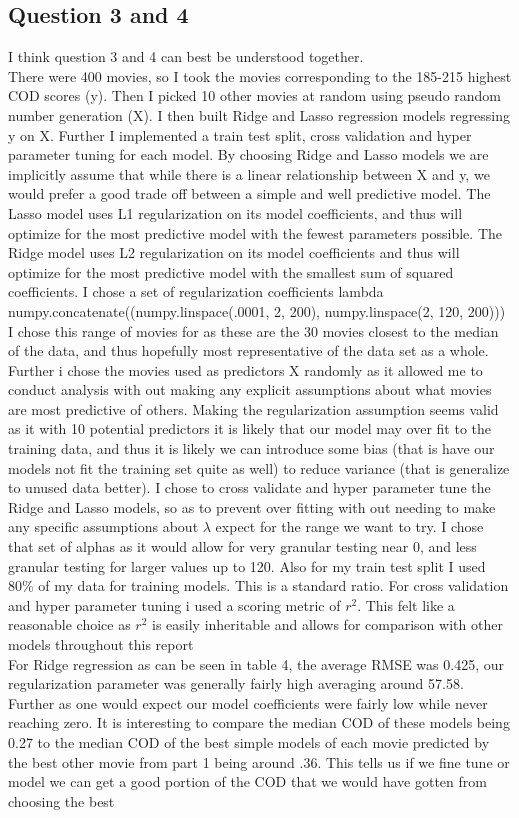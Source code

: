 \documentclass{article}
\begin{document}
\subsection*{Question 3 and 4}
I think question 3 and 4 can best be understood together. \\
There were 400 movies, so I took the movies corresponding to the 185-215 highest COD scores (y). Then I picked 10 other movies at random using pseudo random number generation (X). I then built Ridge and Lasso regression models regressing y on X. Further I implemented a train test split, cross validation and hyper parameter tuning for each model. By choosing Ridge and Lasso models we are implicitly assume that while there is a linear relationship between X and y, we would prefer a good trade off between a simple and well predictive model. The Lasso model uses L1 regularization on its model coefficients, and thus will optimize for the most predictive model with the fewest parameters possible. The Ridge model uses L2 regularization on its model coefficients  and thus will optimize for the most predictive model with the smallest sum of squared coefficients. I chose a set of regularization coefficients lambda numpy.concatenate((numpy.linspace(.0001, 2, 200), numpy.linspace(2, 120, 200))) \\ I chose this range of movies for as these are the 30 movies closest to the median of the data, and thus hopefully most representative of the data set as a whole. Further i chose the movies used as predictors X randomly as it allowed me to conduct analysis with out making any explicit assumptions about what movies are most predictive of others. Making the regularization assumption seems valid as it with 10 potential predictors it is likely that our model may over fit to the training data, and thus it is likely we can introduce some bias (that is have our models not fit the training set quite as well) to reduce variance (that is generalize to unused data better). I chose to cross validate  and hyper parameter tune the Ridge and Lasso models, so as to prevent over fitting with out needing to make any specific assumptions about $\lambda$ expect for the range we want to try. I chose that set of alphas as it would allow for very granular testing near 0, and less granular testing for larger values up to 120. Also for my train test split I used 80\% of my data for training models. This is a standard ratio. For cross validation and hyper parameter tuning i used a scoring metric of $r^2$. This felt like a reasonable choice as $r^2$ is easily inheritable and allows for comparison with other models throughout this report\\ For Ridge regression as can be seen in table 4, the average RMSE was 0.425, our regularization parameter was generally fairly high averaging around 57.58. Further as one would expect our model coefficients were fairly low while never reaching zero. It is interesting to compare the median COD of these models being 0.27 to the median COD of the best simple models of each movie predicted by the best other movie from part 1 being around .36. This tells us if we fine tune or model we can get a good portion of the COD that we would have gotten from choosing the best 
\end{document}

